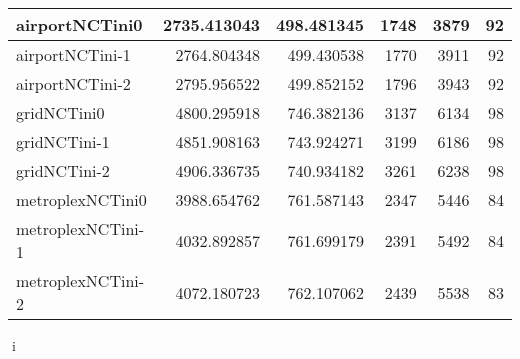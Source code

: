 \begin{longtable}{|l|r|r|r|r|r|}
airportNCTini0 & 2735.413043 & 498.481345 & 1748 & 3879 & 92 \\ \hline
airportNCTini-1 & 2764.804348 & 499.430538 & 1770 & 3911 & 92 \\ \hline
airportNCTini-2 & 2795.956522 & 499.852152 & 1796 & 3943 & 92 \\ \hline
gridNCTini0 & 4800.295918 & 746.382136 & 3137 & 6134 & 98 \\ \hline
gridNCTini-1 & 4851.908163 & 743.924271 & 3199 & 6186 & 98 \\ \hline
gridNCTini-2 & 4906.336735 & 740.934182 & 3261 & 6238 & 98 \\ \hline
metroplexNCTini0 & 3988.654762 & 761.587143 & 2347 & 5446 & 84 \\ \hline
metroplexNCTini-1 & 4032.892857 & 761.699179 & 2391 & 5492 & 84 \\ \hline
metroplexNCTini-2 & 4072.180723 & 762.107062 & 2439 & 5538 & 83 \\ \hline
\end{longtable}
i
